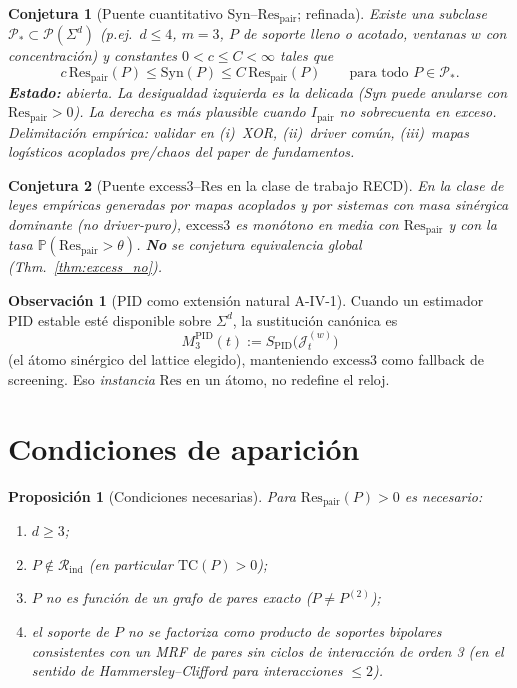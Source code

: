 \documentclass[11pt,a4paper]{article}
\theoremstyle{definition}
\newtheorem{remark}{Observaci\'on}[section]
\theoremstyle{plain}
\newtheorem{proposition}{Proposici\'on}[section]
\newtheorem{conjecture}{Conjetura}[section]
\theoremstyle{remark}
\newcommand{\Res}{\mathrm{Res}}
\newcommand{\TC}{\mathrm{TC}}
\newcommand{\Syn}{\mathrm{Syn}}
\newcommand{\excess}{\mathrm{excess3}}
\newcommand{\Rind}{\mathcal{R}_{\mathrm{ind}}}
\newcommand{\Jwin}{\mathcal{J}}
\begin{document}
\begin{conjecture}[Puente cuantitativo Syn--$\Res_{\mathrm{pair}}$; refinada]
\label{conj:bridge}
Existe una subclase $\mathcal{P}_\ast\subset\mathcal{P}(\Sigma^d)$
(p.ej.\ $d\le 4$, $m=3$, $P$ de soporte lleno o acotado, ventanas $w$ con
concentraci\'on) y constantes $0<c\le C<\infty$ tales que
\begin{equation}
c\,\Res_{\mathrm{pair}}(P)
\le \Syn(P)
\le C\,\Res_{\mathrm{pair}}(P)
\qquad\text{para todo }P\in\mathcal{P}_\ast.
\end{equation}
\textbf{Estado:} abierta. La desigualdad izquierda es la delicada
(Syn puede anularse con $\Res_{\mathrm{pair}}>0$). La derecha es m\'as
plausible cuando $I_{\mathrm{pair}}$ no sobrecuenta en exceso.
Delimitaci\'on emp\'irica: validar en (i)~XOR, (ii)~driver com\'un,
(iii)~mapas log\'isticos acoplados pre/chaos del paper de fundamentos.
\end{conjecture}

\begin{conjecture}[Puente $\excess$--$\Res$ en la clase de trabajo RECD]
\label{conj:excess_bridge}
En la clase de leyes emp\'iricas generadas por mapas acoplados y por
sistemas con masa sin\'ergica dominante (no driver-puro),
$\excess$ es mon\'otono en media con $\Res_{\mathrm{pair}}$ y con la tasa
$\mathbb{P}(\Res_{\mathrm{pair}}>\theta)$. \textbf{No} se conjetura
equivalencia global (Thm.~\ref{thm:excess_no}).
\end{conjecture}

\begin{remark}[PID como extensi\'on natural A-IV-1]
Cuando un estimador PID estable est\'e disponible sobre $\Sigma^d$, la
sustituci\'on can\'onica es
\[
M_3^{\mathrm{PID}}(t):=S_{\mathrm{PID}}\bigl(\Jwin_t^{(w)}\bigr)
\]
(el \'atomo sin\'ergico del lattice elegido), manteniendo $\excess$ como
fallback de screening. Eso \emph{instancia} $\Res$ en un \'atomo, no
redefine el reloj.
\end{remark}

\section{Condiciones de aparici\'on}
\label{sec:conditions}

\begin{proposition}[Condiciones necesarias]
\label{prop:nec}
Para $\Res_{\mathrm{pair}}(P)>0$ es necesario:
\begin{enumerate}[label=(\roman*)]
  \item $d\ge 3$;
  \item $P\notin\Rind$ (en particular $\TC(P)>0$);
  \item $P$ no es funci\'on de un grafo de pares exacto
  ($P\ne P^{(2)}$);
  \item el soporte de $P$ no se factoriza como producto de
  soportes bipolares consistentes con un MRF de pares sin ciclos de
  interacci\'on de orden 3 (en el sentido de Hammersley--Clifford para
  interacciones $\le 2$).
\end{enumerate}
\end{proposition}
\end{document}
